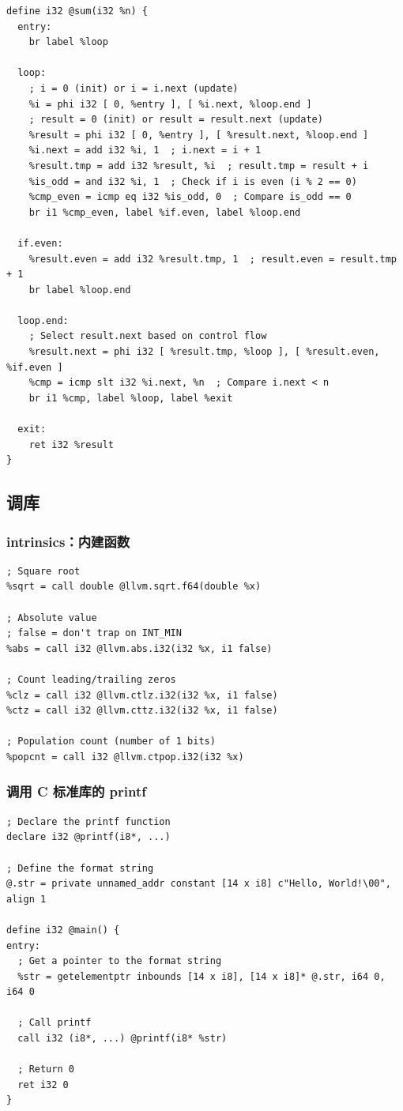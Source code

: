 \begin{lstlisting}[language=none]
define i32 @sum(i32 %n) {
  entry:
    br label %loop

  loop:
    ; i = 0 (init) or i = i.next (update)
    %i = phi i32 [ 0, %entry ], [ %i.next, %loop.end ]
    ; result = 0 (init) or result = result.next (update)
    %result = phi i32 [ 0, %entry ], [ %result.next, %loop.end ]
    %i.next = add i32 %i, 1  ; i.next = i + 1
    %result.tmp = add i32 %result, %i  ; result.tmp = result + i
    %is_odd = and i32 %i, 1  ; Check if i is even (i % 2 == 0)
    %cmp_even = icmp eq i32 %is_odd, 0  ; Compare is_odd == 0
    br i1 %cmp_even, label %if.even, label %loop.end

  if.even:
    %result.even = add i32 %result.tmp, 1  ; result.even = result.tmp + 1
    br label %loop.end

  loop.end:
    ; Select result.next based on control flow
    %result.next = phi i32 [ %result.tmp, %loop ], [ %result.even, %if.even ]
    %cmp = icmp slt i32 %i.next, %n  ; Compare i.next < n
    br i1 %cmp, label %loop, label %exit

  exit:
    ret i32 %result
}
\end{lstlisting}

\subsection{调库}

\subsubsection{intrinsics：内建函数}
\begin{lstlisting}[language=none]
; Square root
%sqrt = call double @llvm.sqrt.f64(double %x)

; Absolute value
; false = don't trap on INT_MIN
%abs = call i32 @llvm.abs.i32(i32 %x, i1 false)

; Count leading/trailing zeros
%clz = call i32 @llvm.ctlz.i32(i32 %x, i1 false)
%ctz = call i32 @llvm.cttz.i32(i32 %x, i1 false)

; Population count (number of 1 bits)
%popcnt = call i32 @llvm.ctpop.i32(i32 %x)
\end{lstlisting}


\subsubsection{调用 C 标准库的 printf}
\begin{lstlisting}[language=none]
; Declare the printf function
declare i32 @printf(i8*, ...)

; Define the format string
@.str = private unnamed_addr constant [14 x i8] c"Hello, World!\00", align 1

define i32 @main() {
entry:
  ; Get a pointer to the format string
  %str = getelementptr inbounds [14 x i8], [14 x i8]* @.str, i64 0, i64 0

  ; Call printf
  call i32 (i8*, ...) @printf(i8* %str)

  ; Return 0
  ret i32 0
}
\end{lstlisting}

